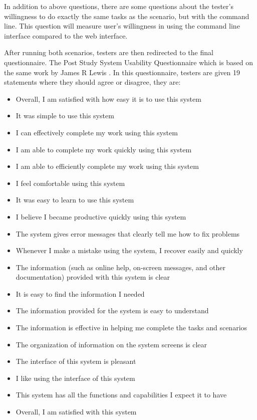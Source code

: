 In addition to above questions, there are some questions about the tester's willingness to do exactly the same tasks as the scenario, but with the command line. This question will measure user's willingness in using the command line interface compared to the web interface. 


After running both scenarios, testers are then redirected to the final questionnaire. The Post Study System Usability Questionnaire which is based on the same work by James R Lewis \citep{lewis1995ibm}. In this questionnaire, testers are given 19 statements where they should agree or disagree, they are:
\begin{itemize}
	\item Overall, I am satisfied with how easy it is to use this system
	\item It was simple to use this system
	\item I can effectively complete my work using this system 
	\item I am able to complete my work quickly using this system
	\item I am able to efficiently complete my work using this system
	\item I feel comfortable using this system
	\item It was easy to learn to use this system
	\item I believe I became productive quickly using this system
	\item The system gives error messages that clearly tell me how to fix problems
	\item Whenever I make a mistake using the system, I recover easily and quickly
	\item The information (such as online help, on-screen messages, and other documentation) provided with this system is clear
	\item It is easy to find the information I needed
	\item The information provided for the system is easy to understand
	\item The information is effective in helping me complete the tasks and scenarios 
	\item The organization of information on the system screens is clear
	\item The interface of this system is pleasant
	\item I like using the interface of this system
	\item This system has all the functions and capabilities I expect it to have 
	\item Overall, I am satisfied with this system
\end{itemize}

